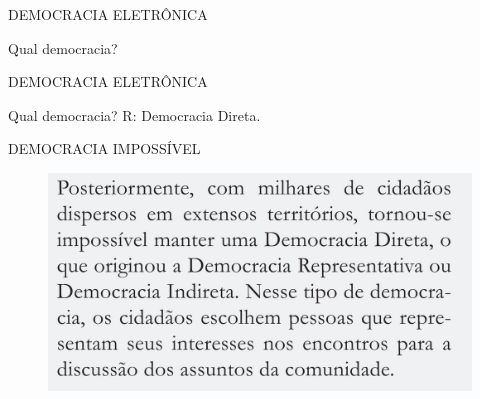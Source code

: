 \documentclass{Alexandre}
\begin{document}
\begin{frame}{DEMOCRACIA ELETRÔNICA}

    Qual democracia?

\end{frame}


\begin{frame}{DEMOCRACIA ELETRÔNICA}

    Qual democracia? R: Democracia Direta.

\end{frame}


\begin{frame}{DEMOCRACIA IMPOSSÍVEL}

    \begin{figure}
        \includegraphics[scale = 0.35]{Figuras/Democracia-Impossivel.jpg}
    \end{figure}

\end{frame}
\end{document}
